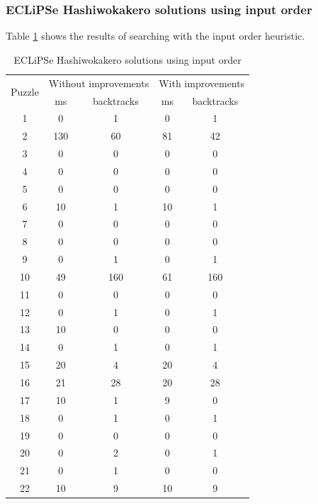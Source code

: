 \documentclass{report}
\begin{document}
\subsubsection{ECLiPSe Hashiwokakero solutions using input order}
Table \ref{table:hashi-1} shows the results of searching with the input order heuristic.
\begin{table}[h!]
\center
  \begin{tabular}{|c|c|c|c|c|}
    \hline
    \multirow{2}{*}{Puzzle} &
    \multicolumn{2}{L|}{Without improvements} &
    \multicolumn{2}{L|}{With improvements}\\
    & ms & backtracks & ms & backtracks \\
    \hline
        1 & 0 & 1 & 0 & 1 \\
        2 & 130 & 60 & 81 & 42 \\
        3 & 0 & 0 & 0 & 0 \\
        4 & 0 & 0 & 0 & 0 \\
        5 & 0 & 0 & 0 & 0 \\
        6 & 10 & 1 & 10 & 1 \\
        7 & 0 & 0 & 0 & 0 \\
        8 & 0 & 0 & 0 & 0 \\
        9 & 0 & 1 & 0 & 1 \\
        10 & 49 & 160 & 61 & 160 \\
        11 & 0 & 0 & 0 & 0 \\
        12 & 0 & 1 & 0 & 1 \\
        13 & 10 & 0 & 0 & 0 \\
        14 & 0 & 1 & 0 & 1 \\
        15 & 20 & 4 & 20 & 4 \\
        16 & 21 & 28 & 20 & 28 \\
        17 & 10 & 1 & 9 & 0 \\
        18 & 0 & 1 & 0 & 1 \\
        19 & 0 & 0 & 0 & 0 \\
        20 & 0 & 2 & 0 & 1 \\
        21 & 0 & 1 & 0 & 0 \\
        22 & 10 & 9 & 10 & 9 \\
    \hline
  \end{tabular}
  \caption{ECLiPSe Hashiwokakero solutions using input order}
  \label{table:hashi-1}
\end{table}
\end{document}
